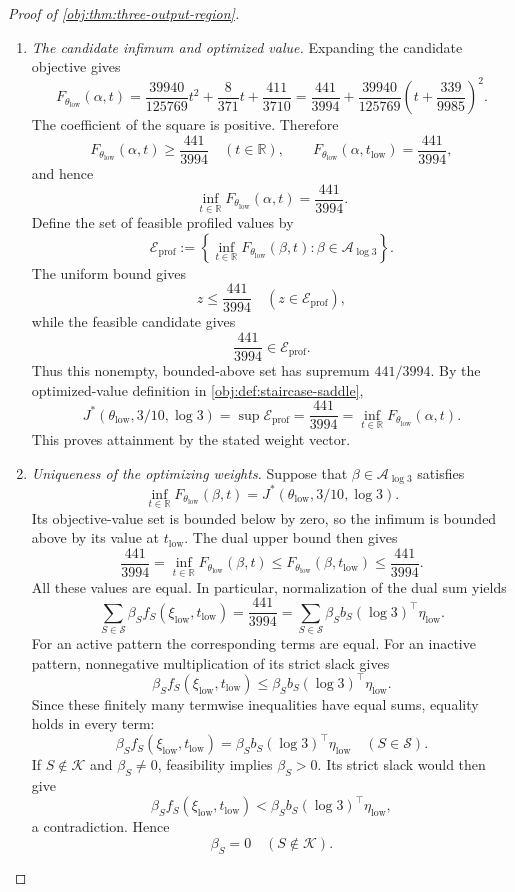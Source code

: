 \documentclass[11pt]{article}
\begin{document}
\begin{proof}[Proof of \cref{obj:thm:three-output-region}]
\begin{enumerate}
\item \textit{The candidate infimum and optimized value.}
Expanding the candidate objective gives
\[
F_{\theta_{\mathrm{low}}}(\alpha,t)
=
\frac{39940}{125769}t^2+\frac8{371}t+\frac{411}{3710}
=
\frac{441}{3994}
+
\frac{39940}{125769}
\left(t+\frac{339}{9985}\right)^2.
\]
The coefficient of the square is positive. Therefore
\[
F_{\theta_{\mathrm{low}}}(\alpha,t)\ge\frac{441}{3994}
\quad(t\in\mathbb R),
\qquad
F_{\theta_{\mathrm{low}}}(\alpha,t_{\mathrm{low}})
=\frac{441}{3994},
\]
and hence
\[
\inf_{t\in\mathbb R}F_{\theta_{\mathrm{low}}}(\alpha,t)
=\frac{441}{3994}.
\]
Define the set of feasible profiled values by
\[
\mathcal E_{\mathrm{prof}}:=
\left\{
\inf_{t\in\mathbb R}F_{\theta_{\mathrm{low}}}(\beta,t):
\beta\in\mathcal A_{\log3}
\right\}.
\]
The uniform bound gives
\[
z\le\frac{441}{3994}\quad(z\in\mathcal E_{\mathrm{prof}}),
\]
while the feasible candidate gives
\[
\frac{441}{3994}\in\mathcal E_{\mathrm{prof}}.
\]
Thus this nonempty, bounded-above set has supremum \(441/3994\). By the optimized-value definition in \cref{obj:def:staircase-saddle},
\[
J^*(\theta_{\mathrm{low}},3/10,\log3)
=
\sup\mathcal E_{\mathrm{prof}}
=
\frac{441}{3994}
=
\inf_{t\in\mathbb R}F_{\theta_{\mathrm{low}}}(\alpha,t).
\]
This proves attainment by the stated weight vector.

\item \textit{Uniqueness of the optimizing weights.}
Suppose that \(\beta\in\mathcal A_{\log3}\) satisfies
\[
\inf_{t\in\mathbb R}F_{\theta_{\mathrm{low}}}(\beta,t)
=
J^*(\theta_{\mathrm{low}},3/10,\log3).
\]
Its objective-value set is bounded below by zero, so the infimum is bounded above by its value at \(t_{\mathrm{low}}\). The dual upper bound then gives
\[
\frac{441}{3994}
=
\inf_{t\in\mathbb R}F_{\theta_{\mathrm{low}}}(\beta,t)
\le
F_{\theta_{\mathrm{low}}}(\beta,t_{\mathrm{low}})
\le
\frac{441}{3994}.
\]
All these values are equal. In particular, normalization of the dual sum yields
\[
\sum_{S\in\mathcal S}\beta_S f_S(\xi_{\mathrm{low}},t_{\mathrm{low}})
=
\frac{441}{3994}
=
\sum_{S\in\mathcal S}\beta_S
b_S(\log3)^\top\eta_{\mathrm{low}}.
\]
For an active pattern the corresponding terms are equal. For an inactive pattern, nonnegative multiplication of its strict slack gives
\[
\beta_S f_S(\xi_{\mathrm{low}},t_{\mathrm{low}})
\le
\beta_S b_S(\log3)^\top\eta_{\mathrm{low}}.
\]
Since these finitely many termwise inequalities have equal sums, equality holds in every term:
\[
\beta_S f_S(\xi_{\mathrm{low}},t_{\mathrm{low}})
=
\beta_S b_S(\log3)^\top\eta_{\mathrm{low}}
\quad(S\in\mathcal S).
\]
If \(S\notin\mathcal K\) and \(\beta_S\ne0\), feasibility implies \(\beta_S>0\). Its strict slack would then give
\[
\beta_S f_S(\xi_{\mathrm{low}},t_{\mathrm{low}})
<
\beta_S b_S(\log3)^\top\eta_{\mathrm{low}},
\]
a contradiction. Hence
\[
\beta_S=0\quad(S\notin\mathcal K).
\]


\end{enumerate}
\end{proof}
\end{document}
